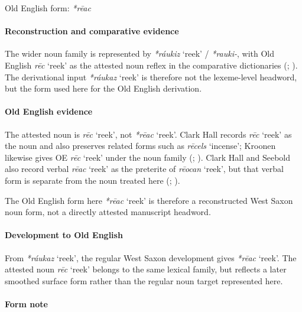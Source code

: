\documentclass[
  british,
  a4paper,
]{article}
\providecommand{\Recon}[1]{\emph{*#1}}
\begin{document}
Old English form: \emph{*rēac}

\paragraph{Reconstruction and comparative
evidence}\label{reconstruction-and-comparative-evidence-149}

The wider noun family is represented by \Recon{ráukiz} `reek' /
{\emph{*rauki-}}, with Old English {\emph{rēc}} `reek' as the attested
noun reflex in the comparative dictionaries
(;
). The derivational input
\Recon{ráukaz} `reek' is therefore not the lexeme-level headword, but
the form used here for the Old English derivation.

\paragraph{Old English evidence}\label{old-english-evidence-151}

The attested noun is {\emph{rēc}} `reek', not \Recon{rēac} `reek'. Clark
Hall records {\emph{rēc}} `reek' as the noun and also preserves related
forms such as {\emph{rēcels}} `incense'; Kroonen likewise gives OE
{\emph{rēc}} `reek' under the noun family
(;
). Clark Hall and Seebold
also record verbal {\emph{rēac}} `reek' as the preterite of
{\emph{rēocan}} `reek', but that verbal form is separate from the noun
treated here (;
).

The Old English form here \Recon{rēac} `reek' is therefore a
reconstructed West Saxon noun form, not a directly attested manuscript
headword.

\paragraph{Development to Old
English}\label{development-to-old-english-150}

From \Recon{ráukaz} `reek', the regular West Saxon development gives
\Recon{rēac} `reek'. The attested noun {\emph{rēc}} `reek' belongs to
the same lexical family, but reflects a later smoothed surface form
rather than the regular noun target represented here.

\paragraph{Form note}\label{form-note-27}
\end{document}
